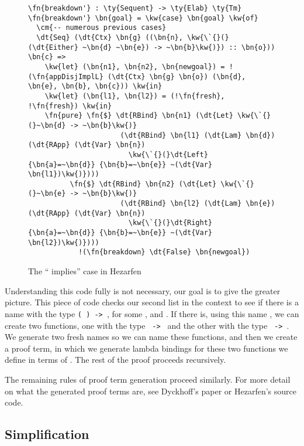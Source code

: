 \begin{figure}[ht]
\caption{The `` implies'' case in Hezarfen}
\label{code:hezarfenTypes}
\begin{Verbatim}[framesep=2mm, label=\footnotesize{\normalfont{Idris}}, labelposition=topline]
\fn{breakdown'} : \ty{Sequent} -> \ty{Elab} \ty{Tm}
\fn{breakdown'} \bn{goal} = \kw{case} \bn{goal} \kw{of}
  \cm{-- numerous previous cases}
  \dt{Seq} (\dt{Ctx} \bn{g} ((\bn{n}, \kw{\`{}(}(\dt{Either} ~\bn{d} ~\bn{e}) -> ~\bn{b}\kw{)}) :: \bn{o})) \bn{c} =>
    \kw{let} (\bn{n1}, \bn{n2}, \bn{newgoal}) = !(\fn{appDisjImplL} (\dt{Ctx} \bn{g} \bn{o}) (\bn{d}, \bn{e}, \bn{b}, \bn{c})) \kw{in}
    \kw{let} (\bn{l1}, \bn{l2}) = (!\fn{fresh}, !\fn{fresh}) \kw{in}
    \fn{pure} \fn{$} \dt{RBind} \bn{n1} (\dt{Let} \kw{\`{}(}~\bn{d} -> ~\bn{b}\kw{)}
                      (\dt{RBind} \bn{l1} (\dt{Lam} \bn{d}) (\dt{RApp} (\dt{Var} \bn{n})
                        \kw{\`{}(}\dt{Left} {\bn{a}=~\bn{d}} {\bn{b}=~\bn{e}} ~(\dt{Var} \bn{l1})\kw{)})))
          \fn{$} \dt{RBind} \bn{n2} (\dt{Let} \kw{\`{}(}~\bn{e} -> ~\bn{b}\kw{)}
                      (\dt{RBind} \bn{l2} (\dt{Lam} \bn{e}) (\dt{RApp} (\dt{Var} \bn{n})
                        \kw{\`{}(}\dt{Right} {\bn{a}=~\bn{d}} {\bn{b}=~\bn{e}} ~(\dt{Var} \bn{l2})\kw{)})))
            !(\fn{breakdown} \dt{False} \bn{newgoal})
\end{Verbatim}
\end{figure}

Understanding this code fully is not necessary, our goal is to give the greater
picture. This piece of code checks our second list in the context to see if
there is a name with the type \texttt{(  ) -> },
for some ,  and . If there is, using this name , we can
create two functions, one with the type \texttt{ -> } and the other
with the type \texttt{ -> }. We generate two fresh names so we can
name these functions, and then we create a proof term, in which we generate
lambda bindings for these two functions we define in terms of . The rest
of the proof proceeds recursively.

The remaining rules of proof term generation proceed similarly. For more detail
on what the generated proof terms are, see Dyckhoff's paper or Hezarfen's
source code.


\subsection{Simplification}

